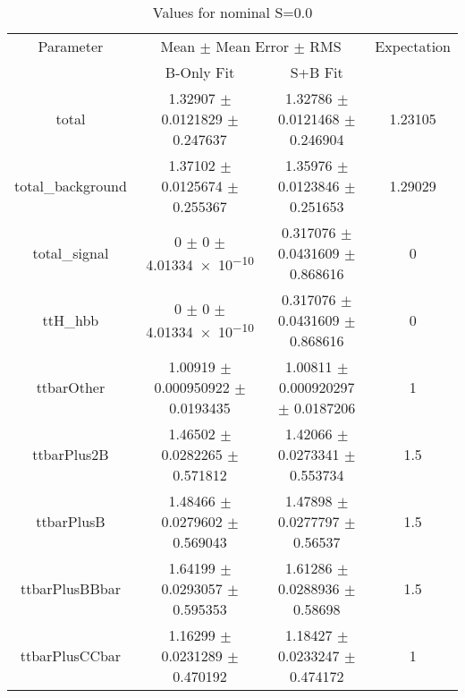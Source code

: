 \begin{table}
\centering
\caption{Values for nominal S=0.0}
\begin{tabular}{cccc}
\toprule
Parameter & \multicolumn{2}{c}{Mean $\pm$ Mean Error $\pm$ RMS} & Expectation\\
 & B-Only Fit & S+B Fit & \\
\midrule
total & \num{1.32907} $\pm$ \num{0.0121829} $\pm$ \num{0.247637} & \num{1.32786} $\pm$ \num{0.0121468} $\pm$ \num{0.246904} & \num{1.23105}\\
total\_background & \num{1.37102} $\pm$ \num{0.0125674} $\pm$ \num{0.255367} & \num{1.35976} $\pm$ \num{0.0123846} $\pm$ \num{0.251653} & \num{1.29029}\\
total\_signal & \num{0} $\pm$ \num{0} $\pm$ \num{4.01334e-10} & \num{0.317076} $\pm$ \num{0.0431609} $\pm$ \num{0.868616} & \num{0}\\
ttH\_hbb & \num{0} $\pm$ \num{0} $\pm$ \num{4.01334e-10} & \num{0.317076} $\pm$ \num{0.0431609} $\pm$ \num{0.868616} & \num{0}\\
ttbarOther & \num{1.00919} $\pm$ \num{0.000950922} $\pm$ \num{0.0193435} & \num{1.00811} $\pm$ \num{0.000920297} $\pm$ \num{0.0187206} & \num{1}\\
ttbarPlus2B & \num{1.46502} $\pm$ \num{0.0282265} $\pm$ \num{0.571812} & \num{1.42066} $\pm$ \num{0.0273341} $\pm$ \num{0.553734} & \num{1.5}\\
ttbarPlusB & \num{1.48466} $\pm$ \num{0.0279602} $\pm$ \num{0.569043} & \num{1.47898} $\pm$ \num{0.0277797} $\pm$ \num{0.56537} & \num{1.5}\\
ttbarPlusBBbar & \num{1.64199} $\pm$ \num{0.0293057} $\pm$ \num{0.595353} & \num{1.61286} $\pm$ \num{0.0288936} $\pm$ \num{0.58698} & \num{1.5}\\
ttbarPlusCCbar & \num{1.16299} $\pm$ \num{0.0231289} $\pm$ \num{0.470192} & \num{1.18427} $\pm$ \num{0.0233247} $\pm$ \num{0.474172} & \num{1}\\
\bottomrule
\end{tabular}
\end{table}